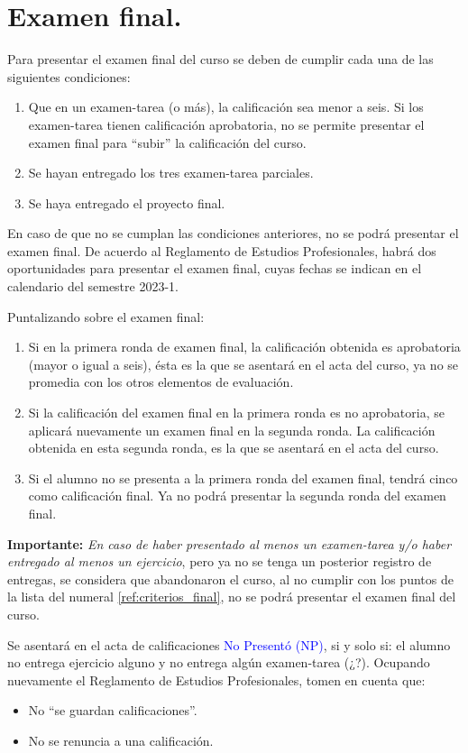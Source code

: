 \section{Examen final.}

Para presentar el examen final del curso se deben de cumplir cada una de las siguientes condiciones:
\begin{enumerate}\label{ref:criterios_final}
\item Que en un examen-tarea (o más), la calificación sea menor a seis. Si los examen-tarea tienen calificación aprobatoria, no se permite presentar el examen final para \enquote{subir} la calificación del curso.
\item Se hayan entregado los tres examen-tarea parciales.
\item Se haya entregado el proyecto final.
\end{enumerate}
En caso de que no se cumplan las condiciones anteriores, no se podrá presentar el examen final. De acuerdo al Reglamento de Estudios Profesionales, habrá dos oportunidades para presentar el examen final, cuyas fechas se indican en el calendario del semestre 2023-1.
\par
Puntalizando sobre el examen final:
\begin{enumerate}[label=\roman*)]
\item Si en la primera ronda de examen final, la calificación obtenida es aprobatoria (mayor o igual a seis), ésta es la que se asentará en el acta del curso, ya no se promedia con los otros elementos de evaluación.
\item Si la calificación del examen final en la primera ronda es no aprobatoria, se aplicará nuevamente un examen final en la segunda ronda. La calificación obtenida en esta segunda ronda, es la que se asentará en el acta del curso.
\item Si el alumno no se presenta a la primera ronda del examen final, tendrá cinco como calificación final. Ya no podrá presentar la segunda ronda del examen final.
\end{enumerate}
\par
\textbf{Importante: } \emph{En caso de haber presentado al menos un examen-tarea y/o haber entregado al menos un ejercicio}, pero ya no se tenga un posterior registro de entregas, se considera que abandonaron el curso, al no cumplir con los puntos de la lista del numeral \ref{ref:criterios_final}, no se podrá presentar el examen final del curso.
\par
Se asentará en el acta de calificaciones \textcolor{blue}{No Presentó (NP)}, si y solo si: el alumno no entrega ejercicio alguno y no entrega algún examen-tarea (¿?). Ocupando nuevamente el Reglamento de Estudios Profesionales, tomen en cuenta que:
\begin{itemize}
\item No \enquote{se guardan calificaciones}.
\item No se renuncia a una calificación.
\end{itemize}

